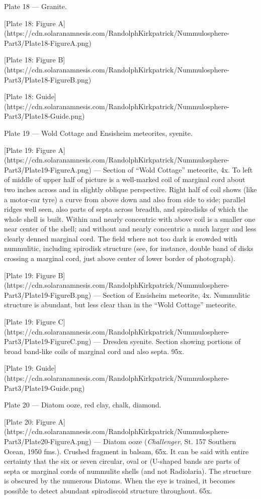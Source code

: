 \documentclass[a4paper, 12pt, oneside]{article}
\begin{document}
Plate 18 --- Granite.

[Plate 18: Figure A](https://cdn.solaranamnesis.com/RandolphKirkpatrick/Nummulosphere-Part3/Plate18-FigureA.png)

[Plate 18: Figure B](https://cdn.solaranamnesis.com/RandolphKirkpatrick/Nummulosphere-Part3/Plate18-FigureB.png)

[Plate 18: Guide](https://cdn.solaranamnesis.com/RandolphKirkpatrick/Nummulosphere-Part3/Plate18-Guide.png)

Plate 19 --- Wold Cottage and Ensisheim meteorites, syenite.

[Plate 19: Figure A](https://cdn.solaranamnesis.com/RandolphKirkpatrick/Nummulosphere-Part3/Plate19-FigureA.png) --- Section of ``Wold Cottage'' meteorite, 4x. To left of middle of upper half of picture is a well-marked coil of marginal cord about two inches across and in slightly oblique perspective. Right half of coil shows (like a motor-car tyre) a curve from above down and also from side to side; parallel ridges well seen, also parts of septa across breadth, and spirodisks of which the whole shell is built. Within and nearly concentric with above coil is a smaller one near center of the shell; and without and nearly concentric a much larger and less clearly denned marginal cord. The field where not too dark is crowded with nummulitic, including spirodisk structure (see, for instance, double band of disks crossing a marginal cord, just above center of lower border of photograph).

[Plate 19: Figure B](https://cdn.solaranamnesis.com/RandolphKirkpatrick/Nummulosphere-Part3/Plate19-FigureB.png) --- Section of Ensisheim meteorite, 4x. Nummulitic structure is abundant, but less clear than in the ``Wold Cottage'' meteorite.

[Plate 19: Figure C](https://cdn.solaranamnesis.com/RandolphKirkpatrick/Nummulosphere-Part3/Plate19-FigureC.png) --- Dresden syenite. Section showing portions of broad band-like coils of marginal cord and also septa. 95x.

[Plate 19: Guide](https://cdn.solaranamnesis.com/RandolphKirkpatrick/Nummulosphere-Part3/Plate19-Guide.png)

Plate 20 --- Diatom ooze, red clay, chalk, diamond.

[Plate 20: Figure A](https://cdn.solaranamnesis.com/RandolphKirkpatrick/Nummulosphere-Part3/Plate20-FigureA.png) --- Diatom ooze (\emph{Challenger}, St. 157 Southern Ocean, 1950 fms.). Crushed fragment in balsam, 65x. It can be said with entire certainty that the six or seven circular, oval or (U-shaped bands are parts of septa or marginal cords of nummulite shells (and not Radiolaria). The structure is obscured by the numerous Diatoms. When the eye is trained, it becomes possible to detect abundant spirodiscoid structure throughout. 65x.
\end{document}
